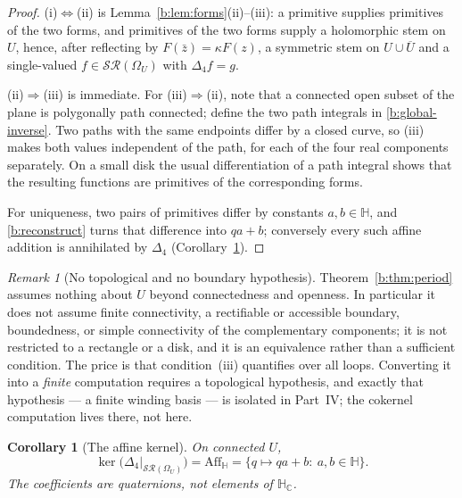 \documentclass[11pt,a4paper]{article}
\numberwithin{equation}{section}
\newtheorem{corollary}[theorem]{Corollary}
\theoremstyle{definition}
\theoremstyle{remark}
\newtheorem{remark}[theorem]{Remark}
\theoremstyle{plain}
\newcommand{\HH}{\mathbb H}
\newcommand{\HC}{\mathbb H_{\mathbb C}}
\newcommand{\lap}{\Delta_4}
\newcommand{\SR}{\mathcal{SR}}
\newcommand{\Om}{\Omega}
\newcommand{\Aff}{\mathrm{Aff}_{\HH}}
\begin{document}
\begin{proof}
(i)$\Leftrightarrow$(ii) is Lemma~\ref{b:lem:forms}(ii)--(iii): a primitive
supplies primitives of the two forms, and primitives of the two forms supply a
holomorphic stem on $U$, hence, after reflecting by
$F(\bar z)=\kappa F(z)$, a symmetric stem on $U\cup\overline U$ and a
single-valued $f\in\SR(\Om_U)$ with $\lap f=g$.

(ii)$\Rightarrow$(iii) is immediate.  For (iii)$\Rightarrow$(ii), note that a
connected open subset of the plane is polygonally path connected; define the
two path integrals in \eqref{b:global-inverse}.  Two paths with the same
endpoints differ by a closed curve, so (iii) makes both values independent of
the path, for each of the four real components separately.  On a small disk
the usual differentiation of a path integral shows that the resulting
functions are primitives of the corresponding forms.

For uniqueness, two pairs of primitives differ by constants $a,b\in\HH$, and
\eqref{b:reconstruct} turns that difference into $qa+b$; conversely every such
affine addition is annihilated by $\lap$ (Corollary~\ref{b:cor:kernel}).
\end{proof}

\begin{remark}[No topological and no boundary hypothesis]
\label{b:rem:nohypothesis}
Theorem~\ref{b:thm:period} assumes nothing about $U$ beyond connectedness and
openness.  In particular it does not assume finite connectivity, a rectifiable
or accessible boundary, boundedness, or simple connectivity of the
complementary components; it is not restricted to a rectangle or a disk, and
it is an equivalence rather than a sufficient condition.  The price is that
condition~(iii) quantifies over all loops.  Converting it into a
\emph{finite} computation requires a topological hypothesis, and exactly that
hypothesis --- a finite winding basis --- is isolated in Part~IV; the
cokernel computation lives there, not here.
\end{remark}

\begin{corollary}[The affine kernel]
\label{b:cor:kernel}
On connected $U$,
\begin{equation}
 \ker\bigl(\lap|_{\SR(\Om_U)}\bigr)=\Aff=\{q\mapsto qa+b:\ a,b\in\HH\}.
 \label{b:kernel}
\end{equation}
The coefficients are \emph{quaternions}, not elements of $\HC$.
\end{corollary}
\end{document}

